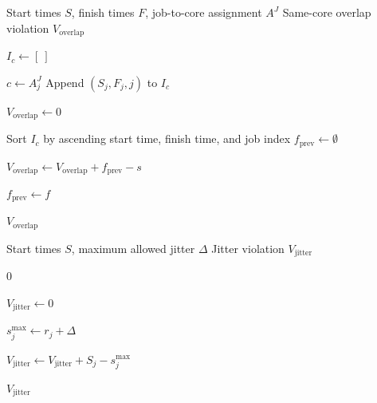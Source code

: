 \documentclass{article}
\begin{document}
\begin{algorithm}[H]
    \caption{Same-Core Overlap Violation}
    \label{alg:same_core_overlap_violation}
    \begin{algorithmic}[1]
        \Require Start times $S$, finish times $F$, job-to-core assignment $A^J$
        \Ensure Same-core overlap violation $V_{\mathrm{overlap}}$

            \State $I_c \gets [\ ]$
        \EndFor

            \State $c \gets A^J_j$
            \State Append $(S_j,F_j,j)$ to $I_c$
        \EndFor

        \State $V_{\mathrm{overlap}} \gets 0$

            \State Sort $I_c$ by ascending start time, finish time, and job index
            \State $f_{\mathrm{prev}} \gets \emptyset$

                    \State $V_{\mathrm{overlap}} \gets V_{\mathrm{overlap}} + f_{\mathrm{prev}} - s$
                \EndIf

                    \State $f_{\mathrm{prev}} \gets f$
                \EndIf
            \EndFor
        \EndFor

        \State \Return $V_{\mathrm{overlap}}$
    \end{algorithmic}
\end{algorithm}

\begin{algorithm}[H]
    \caption{Jitter Violation}
    \label{alg:jitter_violation}
    \begin{algorithmic}[1]
        \Require Start times $S$, maximum allowed jitter $\Delta$
        \Ensure Jitter violation $V_{\mathrm{jitter}}$

            \State \Return $0$
        \EndIf

        \State $V_{\mathrm{jitter}} \gets 0$

            \State $s^{\max}_j \gets r_j + \Delta$

                \State $V_{\mathrm{jitter}} \gets V_{\mathrm{jitter}} + S_j - s^{\max}_j$
            \EndIf
        \EndFor

        \State \Return $V_{\mathrm{jitter}}$
    \end{algorithmic}
\end{algorithm}
\end{document}
